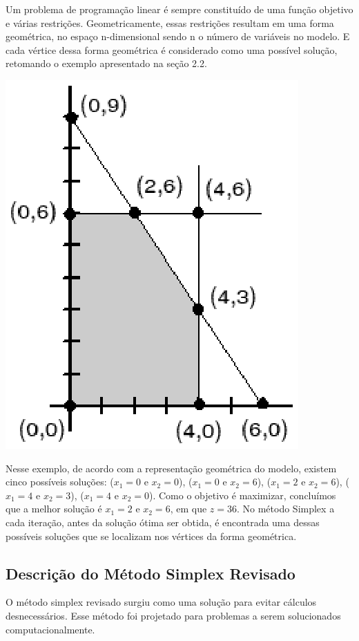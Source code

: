 Um problema de programação linear é sempre constituído de uma função objetivo e várias restrições. Geometricamente, essas restrições resultam em uma forma geométrica, no espaço n-dimensional sendo n o número de variáveis no modelo. E cada vértice dessa forma geométrica é considerado como uma possível solução, retomando o exemplo apresentado na seção 2.2.
\begin{center}
	\includegraphics[scale=1.0]{graficos/graf_simplex_pontos}
	\label{img:simplex_grafico_completo}
\end{center}

Nesse exemplo, de acordo com a representação geométrica do modelo, existem cinco possíveis soluções: ($x_{1}=0$ e $x_{2}=0$), ($x_{1}=0$ e $x_{2}=6$), ($x_{1}=2$ e $x_{2}=6$), ($x_{1}=4$ e $x_{2}=3$), ($x_{1}=4$ e $x_{2}=0$). Como o objetivo é maximizar, concluímos que a melhor solução é $x_{1}=2$ e  $x_{2}=6$, em que $z=36$. No método Simplex a cada iteração, antes da solução ótima ser obtida, é encontrada uma dessas possíveis soluções que se localizam nos vértices da forma geométrica.

\subsection{Descrição do Método Simplex Revisado}
O método simplex revisado surgiu como uma solução para evitar cálculos desnecessários. Esse método foi projetado para problemas a serem solucionados computacionalmente.

